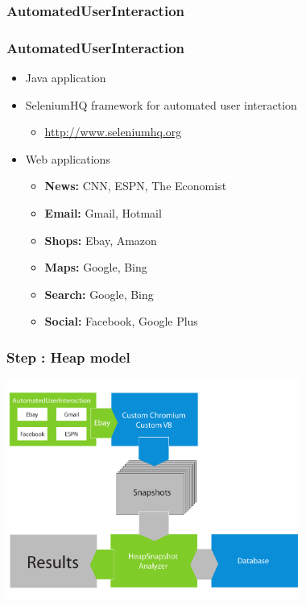 \documentclass[xcolor=x11names,compress]{beamer}
\begin{document}
	\subsubsection{AutomatedUserInteraction}
	\begin{frame}
		\frametitle{AutomatedUserInteraction}
		\begin{itemize}
			\item Java application
			\item SeleniumHQ framework for automated user interaction
			\begin{itemize}
				\item \href{http://www.seleniumhq.org/}{http://www.seleniumhq.org}
			\end{itemize}
			\item Web applications
			\begin{itemize}
				\item \textbf{News:} CNN, ESPN, The Economist
				\item \textbf{Email:} Gmail, Hotmail
				\item \textbf{Shops:} Ebay, Amazon
				\item \textbf{Maps:} Google, Bing
				\item \textbf{Search:} Google, Bing
				\item \textbf{Social:} Facebook, Google Plus
			\end{itemize}
		\end{itemize}
	\end{frame}
	
	\begin{frame}
		\frametitle{Step \theStepCounter: Heap model}		
		\includegraphics[width=26em]{./imgs/solution_h.pdf}
	\end{frame}
\end{document}
